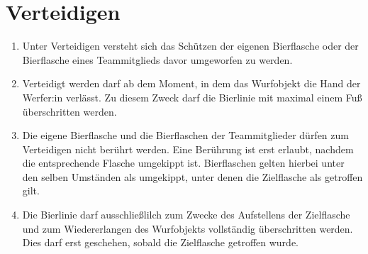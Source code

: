 \section{Verteidigen}
\begin{enumerate}[label={(\arabic*)}]
    \item
    Unter Verteidigen versteht sich das Schützen der eigenen Bierflasche oder der Bierflasche eines Teammitglieds davor umgeworfen zu werden.

    \item
    Verteidigt werden darf ab dem Moment, in dem das Wurfobjekt die Hand der Werfer:in verlässt.
    Zu diesem Zweck darf die Bierlinie mit maximal einem Fuß überschritten werden.

    \item
    Die eigene Bierflasche und die Bierflaschen der Teammitglieder dürfen zum Verteidigen nicht berührt werden.
    Eine Berührung ist erst erlaubt, nachdem die entsprechende Flasche umgekippt ist.
    Bierflaschen gelten hierbei unter den selben Umständen als umgekippt, unter denen die Zielflasche als getroffen gilt.

    \item
    Die Bierlinie darf ausschließlilch zum Zwecke des Aufstellens der Zielflasche und zum Wiedererlangen des Wurfobjekts vollständig überschritten werden.
    Dies darf erst geschehen, sobald die Zielflasche getroffen wurde.
\end{enumerate}

